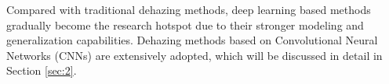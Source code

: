 \documentclass[lettersize,journal]{IEEEtran}
\begin{document}
Compared with traditional dehazing methods, deep learning based methods gradually become the research hotspot due to their stronger modeling and generalization capabilities.  Dehazing methods based on Convolutional Neural Networks (CNNs) are extensively adopted, which will be discussed in detail in Section \ref{sec:2}.  %



\end{document}
